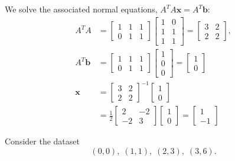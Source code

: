 \documentclass{exam}
\newcommand{\bx}{\mathbf{x}}
\newcommand{\bb}{\mathbf{b}}
\newcommand{\mat}[1]{\begin{bmatrix}#1\end{bmatrix}}
\begin{document}
\begin{questions}
\begin{parts}
	      	      \begin{solution} We solve the associated normal equations, $A^TA\bx = A^T\bb$:
	      	      \begin{align*}
	      	      	A^TA & = \mat{1 & 1 & 1 \\0&1&1}\mat{1&0\\1&1\\1&1}
	      	      	= \mat{3&2\\2&2},\\
	      	      	A^T\bb & = \mat{1&1&1\\0&1&1}\mat{1\\0\\0}=\mat{1\\0}\\
	      	      	\bx &=\mat{3&2\\2&2}^{-1}\mat{1\\0}\\
	      	      	&=\frac12\mat{2&-2\\-2&3}\mat{1\\0} = \mat{1\\-1}
					\end{align*}
				\end{solution}
	      	      	      	      	      	      
	      \end{parts}
	      	      	      	      	      
	      	      	      	      	      		  
	      	      	      	      	      	      	      	      
	\question Consider the dataset
	      \[
	      	(0, 0),\; (1, 1),\; (2, 3),\; (3, 6).
	      \]
\end{questions}
\end{document}
